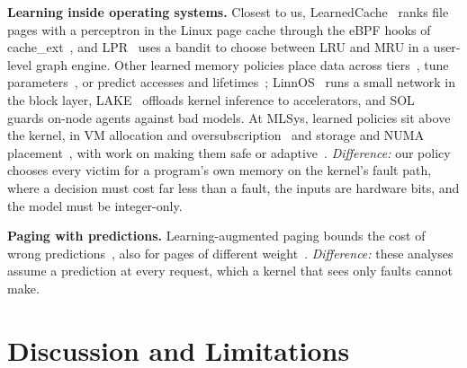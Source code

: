 \documentclass{article}
\newcommand{\finding}[1]{\textbf{#1}\hspace{0.4em}}
\begin{document}
\finding{Learning inside operating systems.} Closest to us,
LearnedCache~\citep{qi2026learnedcache} ranks file pages with a perceptron in the Linux
page cache through the eBPF hooks of cache\_ext~\citep{zussman2025cacheext}, and
LPR~\citep{kim2025lpr} uses a bandit to choose between LRU and MRU in a user-level graph
engine. Other learned memory policies place data across
tiers~\citep{doudali2019kleio,singh2022sibyl,ramaswamy2026xtier}, tune
parameters~\citep{lagarcavilla2019farmemory,akgun2021kml}, or predict accesses and
lifetimes~\citep{hashemi2018learning,maas2020llama,qiu2021rmt}; LinnOS~\citep{hao2020linnos}
runs a small network in the block layer, LAKE~\citep{fingler2023lake} offloads kernel
inference to accelerators, and SOL~\citep{wang2022sol} guards on-node agents against bad
models. At MLSys, learned policies sit above the kernel, in VM allocation and
oversubscription~\citep{barbalho2023vmalloc,ling2025lava,wang2025protorail} and storage
and NUMA placement~\citep{yang2025byom,zhao2026catur}, with work on making them safe or
adaptive~\citep{mallick2022matchmaker,tan2023ouroboros,qiu2024flash,gohil2026uncertain}.
\emph{Difference:} our policy chooses every victim for a program's own memory on the
kernel's fault path, where a decision must cost far less than a fault, the inputs are
hardware bits, and the model must be integer-only.

\finding{Paging with predictions.} Learning-augmented paging bounds the cost of wrong
predictions~\citep{lykouris2021jacm,rohatgi2020,wei2020,im2022parsimonious}, also for
pages of different weight~\citep{bansal2022weighted}. \emph{Difference:} these analyses
assume a prediction at every request, which a kernel that sees only faults cannot make.
\section{Discussion and Limitations}
\label{sec:discussion}
\end{document}
